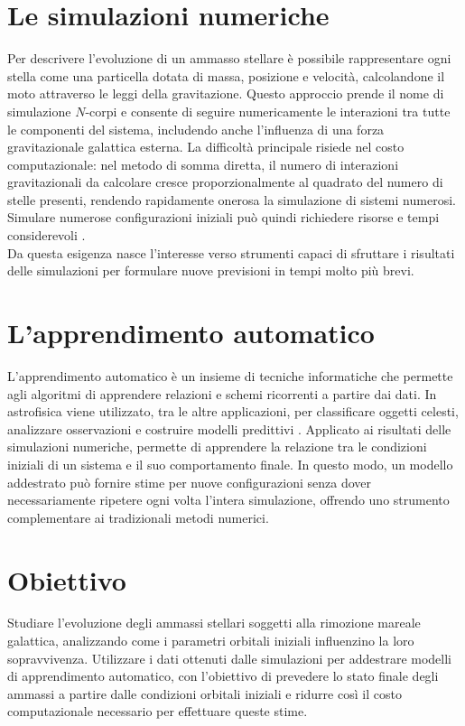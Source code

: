 \section{Le simulazioni numeriche}
\label{sec:simulazioni-numeriche}
Per descrivere l'evoluzione di un ammasso stellare è possibile rappresentare ogni stella come una particella dotata di massa, posizione e velocità, calcolandone il moto attraverso le leggi della gravitazione. Questo approccio prende il nome di simulazione $N$-corpi e consente di seguire numericamente le interazioni tra tutte le componenti del sistema, includendo anche l'influenza di una forza gravitazionale galattica esterna.
La difficoltà principale risiede nel costo computazionale: nel metodo di somma diretta, il numero di interazioni gravitazionali da calcolare cresce proporzionalmente al quadrato del numero di stelle presenti, rendendo rapidamente onerosa la simulazione di sistemi numerosi. Simulare numerose configurazioni iniziali può quindi richiedere risorse e tempi considerevoli \cite{spurzem2023}.\\ Da questa esigenza nasce l'interesse verso strumenti capaci di sfruttare i risultati delle simulazioni per formulare nuove previsioni in tempi molto più brevi.
\section{L'apprendimento automatico}
\label{sec:apprendimento-automatico}
L'apprendimento automatico è un insieme di tecniche informatiche che permette agli algoritmi di apprendere relazioni e schemi ricorrenti a partire dai dati. In astrofisica viene utilizzato, tra le altre applicazioni, per classificare oggetti celesti, analizzare osservazioni e costruire modelli predittivi \cite{rodriguez2022}.
Applicato ai risultati delle simulazioni numeriche, permette di apprendere la relazione tra le condizioni iniziali di un sistema e il suo comportamento finale. In questo modo, un modello addestrato può fornire stime per nuove configurazioni senza dover necessariamente ripetere ogni volta l'intera simulazione, offrendo uno strumento complementare ai tradizionali metodi numerici.
\section{Obiettivo}
\label{sec:obiettivo}
Studiare l'evoluzione degli ammassi stellari soggetti alla rimozione mareale galattica, analizzando come i parametri orbitali iniziali influenzino la loro sopravvivenza. Utilizzare i dati ottenuti dalle simulazioni per addestrare modelli di apprendimento automatico, con l'obiettivo di prevedere lo stato finale degli ammassi a partire dalle condizioni orbitali iniziali e ridurre così il costo computazionale necessario per effettuare queste stime.